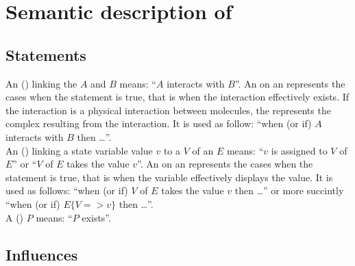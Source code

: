 \section{Semantic description of \ERs}


\subsection{Statements}

An  () linking the  $A$ and $B$ means: ``$A$ interacts with $B$''. An  on an  represents the cases when the statement is true, that is when the interaction effectively exists. If the interaction is a physical interaction between molecules, the  represents the complex resulting from the interaction. It is used as follow: ``when (or if) $A$ interacts with $B$ then \ldots''.\\[\baselineskip]


\noindent
An  () linking a state variable value $v$ to a  $V$ of an  $E$ means: ``$v$ is assigned to $V$ of $E$'' or ``$V$ of $E$ takes the value $v$''. An on an  represents the cases when the statement is true, that is when the variable effectively displays the value. It is used as follows: ``when (or if) $V$ of $E$ takes the value $v$ then \ldots'' or more succintly ``when (or if) $E\{V => v\}$ then \ldots''.\\[\baselineskip]

\noindent
A  () $P$ means: ``$P$ exists''.\\[\baselineskip]

\subsection{Influences}

